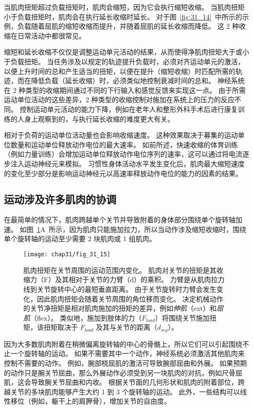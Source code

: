 当肌肉扭矩超过负载扭矩时，肌肉会缩短，因为它会执行缩短收缩。
当肌肉扭矩小于负载扭矩时，肌肉会在执行延长收缩时延长。
对于图~\ref{fig:31_14}~中所示的示例，负载随着屈肌的缩短收缩而提升，并随着屈肌的延长收缩而降低。
这 2 种收缩在日常活动中都很常见。


缩短和延长收缩不仅仅是调整运动单元活动的结果，从而使得净肌肉扭矩大于或小于负载扭矩。
当任务涉及以规定的轨迹提升负载时，必须对齐运动单元的激活，以便上升时间的总和产生适当的扭矩，以便在提升（缩短收缩）时匹配所需的轨迹，而在降低负载（延长收缩）时，必须类似地控制衰减时间的总和。
神经系统在 2 种类型的收缩期间通过不同的下行输入和感觉反馈来实现这一点。
由于所需运动单位活动的这些差异，2 种类型的收缩控制对施加在系统上的压力的反应不同。
控制运动单元活动的能力下降，例如在老年人和整形外科手术后进行康复训练的人身上观察到的，与执行延长收缩的难度更大有关。


相对于负荷的运动单位活动量也会影响收缩速度。
这种效果取决于募集的运动单位数量和运动单位释放动作电位的最大速率。
如前所述，快速收缩的体育训练（例如力量训练）会增加运动单位释放动作电位序列的速率，这可以通过将电流逐步注入运动神经元来模拟。
习惯性身体活动水平发生变化后，肌肉最大缩短速度的变化至少部分是影响运动神经元以高速率释放动作电位的能力的因素的结果。



\subsection{运动涉及许多肌肉的协调}

在最简单的情况下，肌肉跨越单个关节并导致附着的身体部分围绕单个旋转轴加速。
如图~\ref{fig:31_15}A~所示，因为肌肉只能施加拉力，所以当动作涉及缩短收缩时，围绕单个旋转轴的运动至少需要 2 块肌肉或 1 组肌肉。



\begin{figure}[htbp]
	\centering
	\texttt{[image: chap31/fig\_31\_15]}
	\caption{肌肉扭矩在关节周围的运动范围内变化。
	肌肉对关节的扭矩是其收缩力（F）及其相对于关节的力臂（d）的乘积。
	力臂是从肌肉拉力线到关节旋转中心的最短垂直距离。
	由于关节旋转时力臂会发生变化，因此肌肉扭矩会随着关节周围的角位移而变化。
	决定机械动作的关节净扭矩是相对肌肉施加的扭矩的差异，例如\textit{伸肌}（ext）和\textit{屈肌}（flex）。
	类似地，施加到肢体的力（$ F_{load} $）将围绕关节施加扭矩，该扭矩取决于 $ F_{load} $ 及其与关节的距离（$ d_{seg} $）。}
	\label{fig:31_15}
\end{figure}


因为大多数肌肉附着在稍微偏离旋转轴的中心的骨骼上，所以它们可以引起围绕不止一个旋转轴的运动。
如果不需要其中一个动作，神经系统必须激活其他肌肉来控制不需要的动作。
例如，腕部桡屈肌的激活可导致腕部屈曲和外展。
如果预期的动作只是腕关节屈曲，那么外展动作必须受到另一块肌肉的对抗，例如尺骨屈肌，这会导致腕关节屈曲和内收。
根据关节面的几何形状和肌肉的附着部位，跨越关节的多块肌肉能够产生大约 1 到 3 个旋转轴的运动。
此外，一些结构可以线性移位（例如，躯干上的肩胛骨），增加关节的自由度。



